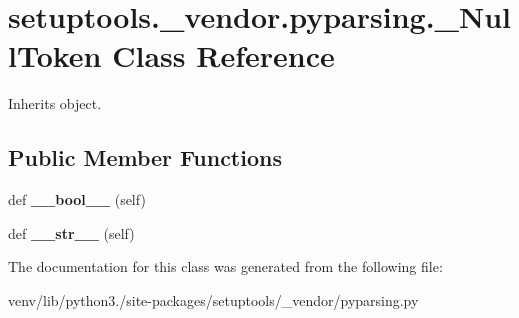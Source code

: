 \hypertarget{classsetuptools_1_1__vendor_1_1pyparsing_1_1___null_token}{}\section{setuptools.\+\_\+vendor.\+pyparsing.\+\_\+\+Null\+Token Class Reference}
\label{classsetuptools_1_1__vendor_1_1pyparsing_1_1___null_token}


Inherits object.

\subsection*{Public Member Functions}
\begin{DoxyCompactItemize}
\item 
\mbox{\label{classsetuptools_1_1__vendor_1_1pyparsing_1_1___null_token_a27494b6079703fa74e406036865a6a20}} 
def {\bfseries \+\_\+\+\_\+bool\+\_\+\+\_\+} (self)
\item 
\mbox{\label{classsetuptools_1_1__vendor_1_1pyparsing_1_1___null_token_abeb86c8240d0dc2fcc7a559dc21b0f3b}} 
def {\bfseries \+\_\+\+\_\+str\+\_\+\+\_\+} (self)
\end{DoxyCompactItemize}


The documentation for this class was generated from the following file\+:\begin{DoxyCompactItemize}
\item 
venv/lib/python3./site-\/packages/setuptools/\+\_\+vendor/pyparsing.\+py\end{DoxyCompactItemize}
